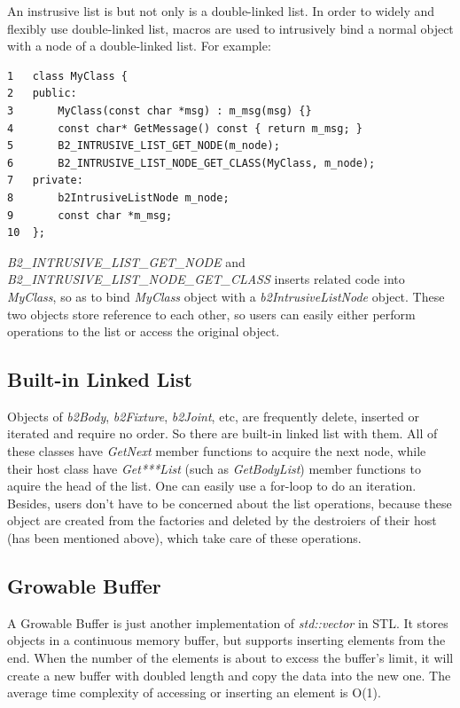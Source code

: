 \documentclass[UTF8]{ctexart}
\begin{document}
            An instrusive list is but not only is a double-linked list. In order to widely and flexibly use double-linked list, macros are used to intrusively bind a normal object with a node of a double-linked list. For example:

            \begin{verbatim}
1   class MyClass {
2   public:
3       MyClass(const char *msg) : m_msg(msg) {}
4       const char* GetMessage() const { return m_msg; }
5       B2_INTRUSIVE_LIST_GET_NODE(m_node);
6       B2_INTRUSIVE_LIST_NODE_GET_CLASS(MyClass, m_node);
7   private:
8       b2IntrusiveListNode m_node;
9       const char *m_msg;
10  };
            \end{verbatim}

            \textit{B2\_INTRUSIVE\_LIST\_GET\_NODE} and \textit{B2\_INTRUSIVE\_LIST\_NODE\_GET\_CLASS} inserts related code into \textit{MyClass}, so as to bind \textit{MyClass} object with a \textit{b2IntrusiveListNode} object. These two objects store reference to each other, so users can easily either perform operations to the list or access the original object.

        \subsection{Built-in Linked List}

        Objects of \textit{b2Body}, \textit{b2Fixture}, \textit{b2Joint}, etc, are frequently delete, inserted or iterated and require no order. So there are built-in linked list with them. All of these classes have \textit{GetNext} member functions to acquire the next node, while their host class have \textit{Get***List} (such as \textit{GetBodyList}) member functions to aquire the head of the list. One can easily use a for-loop to do an iteration. Besides, users don't have to be concerned about the list operations, because these object are created from the factories and deleted by the destroiers of their host (has been mentioned above), which take care of these operations.

        \subsection{Growable Buffer}

            A Growable Buffer is just another implementation of \textit{std::vector} in STL. It stores objects in a continuous memory buffer, but supports inserting elements from the end. When the number of the elements is about to excess the buffer's limit, it will create a new buffer with doubled length and copy the data into the new one. The average time complexity of accessing or inserting an element is O(1).
\end{document}
